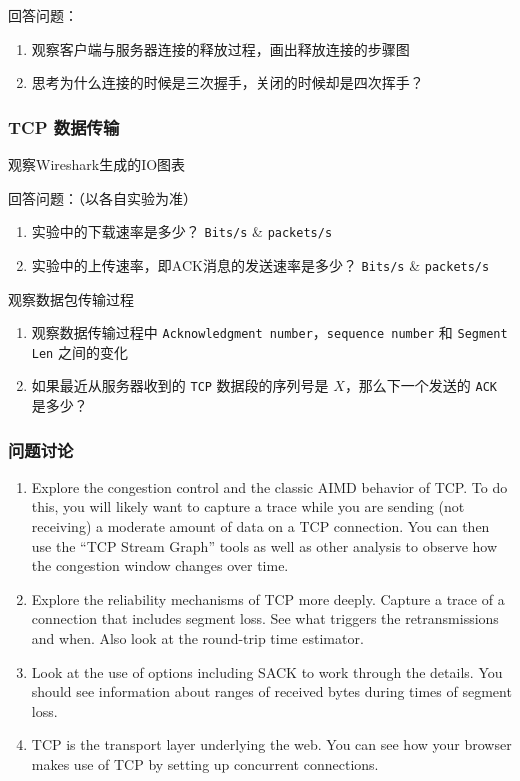 \documentclass{article}
\begin{document}
回答问题：
\begin{enumerate}[noitemsep]
  \item 观察客户端与服务器连接的释放过程，画出释放连接的步骤图
  \item 思考为什么连接的时候是三次握手，关闭的时候却是四次挥手？
\end{enumerate}

\subsubsection{TCP 数据传输}

观察Wireshark生成的IO图表

回答问题：（以各自实验为准）
\begin{enumerate}[label={\arabic*）}, noitemsep]
  \item 实验中的下载速率是多少？ \texttt{Bits/s} \& \texttt{packets/s}
  \item 实验中的上传速率，即ACK消息的发送速率是多少？ \texttt{Bits/s} \& \texttt{packets/s}
\end{enumerate}

观察数据包传输过程

\begin{enumerate}[noitemsep]
  \item 观察数据传输过程中 \texttt{Acknowledgment number}，\texttt{sequence number} 和 \texttt{Segment Len} 之间的变化
  \item 如果最近从服务器收到的 \texttt{TCP} 数据段的序列号是 $X$，那么下一个发送的 \texttt{ACK} 是多少？
\end{enumerate}

\subsubsection{问题讨论}

\begin{enumerate}[noitemsep]
  \item Explore the congestion control and the classic AIMD behavior of TCP. To do this, you will likely want to capture a trace while you are sending (not receiving) a moderate amount of data on a TCP connection. You can then use the “TCP Stream Graph” tools as well as other analysis to observe how the congestion window changes over time.
  \item Explore the reliability mechanisms of TCP more deeply. Capture a trace of a connection that includes segment loss. See what triggers the retransmissions and when. Also look at the round-trip time estimator.
  \item Look at the use of options including SACK to work through the details. You should see information about ranges of received bytes during times of segment loss.
  \item TCP is the transport layer underlying the web. You can see how your browser makes use of TCP by setting up concurrent connections.
\end{enumerate}
\end{document}

